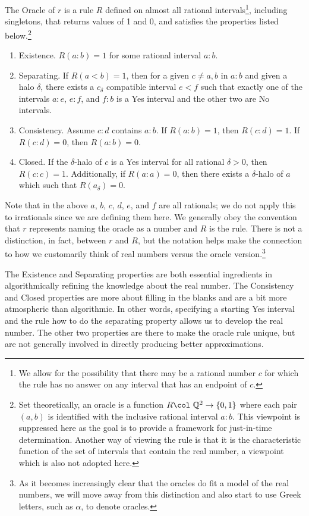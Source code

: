 \documentclass[12pt]{article}
\begin{document}
The Oracle of $r$ is a rule $R$ defined on almost all rational intervals\footnote{We allow for the possibility that there may be a rational number $c$ for which the rule has no answer on any interval that has an endpoint of $c$.}, including singletons, that returns values of 1 and 0, and satisfies the properties listed below.\footnote{Set theoretically, an oracle is a function $R \col \ \mathbb{Q}^2 \to \{0,1\}$ where each pair $(a,b)$ is identified with the inclusive rational interval $a:b$. This viewpoint is suppressed here as the goal is to provide a framework for just-in-time determination.  Another way of viewing the rule is that it is the characteristic function of the set of intervals that contain the real number, a viewpoint which is also not adopted here.} 
\begin{enumerate}
    \item Existence. $R(a:b) = 1$ for some rational interval $a:b$.
    \item Separating. If $R(a\lt b)=1$, then for a given $c \neq a, b$ in $a:b$ and given a halo $\delta$, there exists a $c_{\delta}$ compatible interval $e \lt f$ such that exactly one of the intervals $a:e$, $e:f$, and $f:b$ is a Yes interval and the other two are No intervals. 
    \item Consistency. Assume $c:d$ contains $a:b$. If $R(a:b) = 1$, then $R(c:d) = 1$. If $R(c:d)=0$, then $R(a:b) = 0$. 
    \item Closed. If the $\delta$-halo of $c$ is a Yes interval for all rational $\delta>0$, then $R(c:c) = 1$. Additionally, if $R(a:a)=0$, then there exists a $\delta$-halo of $a$ which such that $R(a_\delta) = 0$.
\end{enumerate}

Note that in the above $a$, $b$, $c$, $d$, $e$, and $f$ are all rationals; we do not apply this to irrationals since we are defining them here. We generally obey the convention that $r$ represents naming the oracle as a number and $R$ is the rule. There is not a distinction, in fact, between $r$ and $R$, but the notation helps make the connection to how we customarily think of real numbers versus the oracle version.\footnote{As it becomes increasingly clear that the oracles do fit a model of the real numbers, we will move away from this distinction and also start to use Greek letters, such as $\alpha$, to denote oracles.}


The Existence and Separating properties are both essential ingredients in algorithmically refining the knowledge about the real number. The Consistency and Closed properties are more about filling in the blanks and are a bit more atmospheric than algorithmic. In other words, specifying a starting Yes interval and the rule how to do the separating property allows us to develop the real number. The other two properties are there to make the oracle rule unique, but are not generally involved in directly producing better approximations. 
\end{document}
